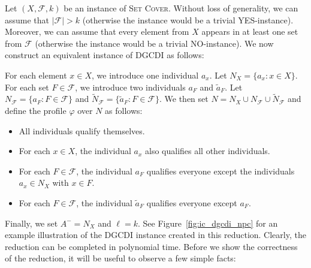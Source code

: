 \documentclass[
    12pt,               %
    a4paper,            %
    bibtotoc,           %
    pointlessnumbers,   %
    ngerman,            %
    titlepage,          %
    leqno,              %
    ]{scrarticle}       %
\newcommand\figref{Figure~\ref}
\begin{document}
\begin{Proof}
Let $(X, \mathcal{F}, k)$ be an instance of \textsc{Set Cover}. Without loss of generality, we can assume that $|\mathcal{F}| > k$ (otherwise the instance would be a trivial YES-instance). Moreover, we can assume that every element from $X$ appears in at least one set from $\mathcal{F}$ (otherwise the instance would be a trivial NO-instance). We now construct an equivalent instance of DGCDI as follows:

For each element $x \in X$, we introduce one individual $a_x$. Let $N_X = \{ a_x : x \in X \}$. For each set $F \in \mathcal{F}$, we introduce two individuals $a_F$ and $\tilde{a}_F$. Let $N_\mathcal{F} = \{ a_F : F \in \mathcal{F} \}$ and $\tilde{N}_\mathcal{F} = \{ \tilde{a}_F : F \in \mathcal{F} \}$. We then set $N = N_X \cup N_\mathcal{F} \cup \tilde{N}_\mathcal{F}$ and define the profile $\varphi$ over $N$ as follows:

\begin{itemize}[nolistsep]
\item
All individuals qualify themselves.
\item
For each $x \in X$, the individual $a_x$ also qualifies all other individuals.
\item
For each $F \in \mathcal{F}$, the individual $a_F$ qualifies everyone except the individuals $a_x \in N_X$ with $x \in F$.
\item
For each $F \in \mathcal{F}$, the individual $\tilde{a}_F$ qualifies everyone except $a_F$.
\end{itemize}

Finally, we set $A^- = N_X$ and $\ell = k$. See \figref{fig:ic_dgcdi_npc} for an example illustration of the DGCDI instance created in this reduction. Clearly, the reduction can be completed in polynomial time. Before we show the correctness of the reduction, it will be useful to observe a few simple facts:



\begin{figure}[!tbh]
\centering
\raisebox{0.04\height}{
\begin{tikzpicture}[
    > = Stealth,
    shorten > = 1pt,
    auto,
    node distance = 2.5cm,
    main node/.style = {circle, draw, minimum size = 1.45cm}
]


\end{tikzpicture}}
\end{figure}
\end{Proof}
\end{document}
